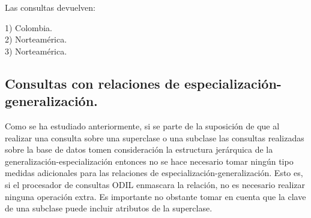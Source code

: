 Las consultas devuelven:

\begin{tabbing}
1) Colombia. \\
2) Norteamérica. \\
3) Norteamérica. \\
\end{tabbing}

\subsection{Consultas con relaciones de especialización-generalización.}

Como se ha estudiado anteriormente, si se parte de la suposición de que al realizar una consulta sobre una superclase o una subclase las consultas realizadas sobre la base de datos tomen consideración la estructura jerárquica de la generalización-especialización entonces no se hace necesario tomar ningún tipo medidas adicionales para las relaciones de especialización-generalización. Esto es, si el procesador de consultas ODIL enmascara la relación, no es necesario realizar ninguna operación extra. Es importante no obstante tomar en cuenta que la clave de una subclase puede incluir atributos de la superclase.